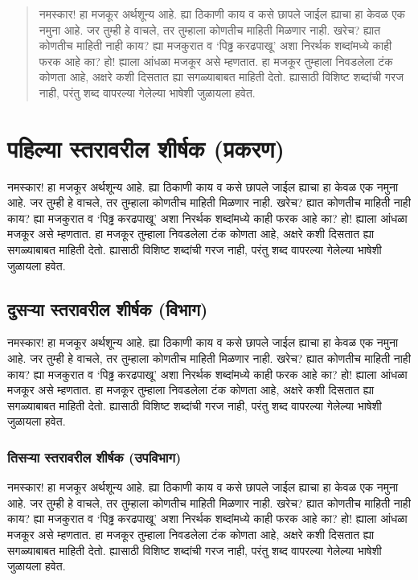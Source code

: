 \maketitle
\begin{abstract}
नमस्कार! हा मजकूर अर्थशून्य आहे. ह्या ठिकाणी काय व कसे छापले जाईल ह्याचा हा केवळ एक नमुना आहे. जर तुम्ही हे वाचले, तर तुम्हाला कोणतीच माहिती मिळणार नाही. खरेच? ह्यात कोणतीच माहिती नाही काय? ह्या मजकुरात व `पिढ्ढ करढपाखू' अशा निरर्थक शब्दांमध्ये काही फरक आहे का? हो! ह्याला आंधळा मजकूर असे म्हणतात. हा मजकूर तुम्हाला निवडलेला टंक कोणता आहे, अक्षरे कशी दिसतात ह्या सगळ्याबाबत माहिती देतो. ह्यासाठी विशिष्ट शब्दांची गरज नाही, परंतु शब्द वापरल्या गेलेल्या भाषेशी जुळायला हवेत.
\end{abstract}
\tableofcontents
\chapter{पहिल्या स्तरावरील शीर्षक (प्रकरण)}
नमस्कार! हा मजकूर अर्थशून्य आहे. ह्या ठिकाणी काय व कसे छापले जाईल ह्याचा हा केवळ एक नमुना आहे. जर तुम्ही हे वाचले, तर तुम्हाला कोणतीच माहिती मिळणार नाही. खरेच? ह्यात कोणतीच माहिती नाही काय? ह्या मजकुरात व `पिढ्ढ करढपाखू' अशा निरर्थक शब्दांमध्ये काही फरक आहे का? हो! ह्याला आंधळा मजकूर असे म्हणतात. हा मजकूर तुम्हाला निवडलेला टंक कोणता आहे, अक्षरे कशी दिसतात ह्या सगळ्याबाबत माहिती देतो. ह्यासाठी विशिष्ट शब्दांची गरज नाही, परंतु शब्द वापरल्या गेलेल्या भाषेशी जुळायला हवेत.
\section{दुसऱ्या स्तरावरील शीर्षक (विभाग)}
नमस्कार! हा मजकूर अर्थशून्य आहे. ह्या ठिकाणी काय व कसे छापले जाईल ह्याचा हा केवळ एक नमुना आहे. जर तुम्ही हे वाचले, तर तुम्हाला कोणतीच माहिती मिळणार नाही. खरेच? ह्यात कोणतीच माहिती नाही काय? ह्या मजकुरात व `पिढ्ढ करढपाखू' अशा निरर्थक शब्दांमध्ये काही फरक आहे का? हो! ह्याला आंधळा मजकूर असे म्हणतात. हा मजकूर तुम्हाला निवडलेला टंक कोणता आहे, अक्षरे कशी दिसतात ह्या सगळ्याबाबत माहिती देतो. ह्यासाठी विशिष्ट शब्दांची गरज नाही, परंतु शब्द वापरल्या गेलेल्या भाषेशी जुळायला हवेत.
\subsection{तिसऱ्या स्तरावरील शीर्षक (उपविभाग)}
नमस्कार! हा मजकूर अर्थशून्य आहे. ह्या ठिकाणी काय व कसे छापले जाईल ह्याचा हा केवळ एक नमुना आहे. जर तुम्ही हे वाचले, तर तुम्हाला कोणतीच माहिती मिळणार नाही. खरेच? ह्यात कोणतीच माहिती नाही काय? ह्या मजकुरात व `पिढ्ढ करढपाखू' अशा निरर्थक शब्दांमध्ये काही फरक आहे का? हो! ह्याला आंधळा मजकूर असे म्हणतात. हा मजकूर तुम्हाला निवडलेला टंक कोणता आहे, अक्षरे कशी दिसतात ह्या सगळ्याबाबत माहिती देतो. ह्यासाठी विशिष्ट शब्दांची गरज नाही, परंतु शब्द वापरल्या गेलेल्या भाषेशी जुळायला हवेत.
